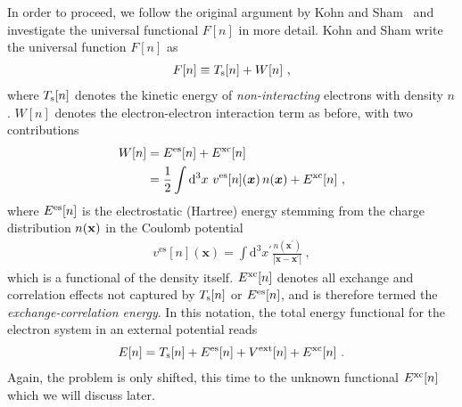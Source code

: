 In order to proceed, we follow the original argument by Kohn and Sham~\cite{Kohn.1965} and investigate the universal functional $F[n]$ in more detail. 
Kohn and Sham write the universal function $F [n]$ as
%
\begin{align}
	F[n] 
		\equiv T_{\rm s}[n] + W[n]~,
	\label{eq:dft.Fn.2}
\end{align}
%
%
where $T_{\rm s}[n]$ denotes the kinetic energy of \emph{non-interacting} electrons with density $n$. $W[n]$ denotes the electron-electron interaction term as before, with two contributions
\begin{align}
	\begin{split}
	W[n] 
		&= E^{\rm es} [n] + E^{\rm xc} [n] \\
		&= \frac{1}{2} \int \mathrm{d}^{3} x ~ 
			v^{\mathrm{es}}[n](\boldsymbol{x}) \, n(\boldsymbol{x})+E^{\mathrm{xc}}[n]~,
	\end{split}
	\label{eq:dft.KS.W}
\end{align}
where $E^{\rm es} [n]$ is the electrostatic (Hartree) energy stemming from the charge distribution $n ({\bf x})$ in the Coulomb potential
\begin{align}
	v^{\mathrm{es}}[n](\boldsymbol{x})
		= \int \mathrm{d}^{3} x^{\prime} \frac{n\left(\boldsymbol{x}^{\prime}\right)}{\left|\boldsymbol{x}-\boldsymbol{x}^{\prime}\right|}~,
	\label{eq:dft.KS.ves}
\end{align}
which is a functional of the density itself. $E^{\rm xc} [n]$ denotes all exchange and correlation effects not captured by $T_{\rm s} [n]$ or $E^{\rm es} [n]$, and is therefore termed the \emph{exchange-correlation energy}. 
%
In this notation, the total energy functional for the electron system in an external potential reads
\begin{align}
	E[n]
		= T_{\rm s}[n] +  E^{\rm es}[n] + V^{\rm ext}[n] + E^{\rm xc} [n]~.
	\label{eq:dft.Ks.En}
\end{align}
%
Again, the problem is only shifted, this time to the unknown functional $E^{\rm xc} [n]$ which we will discuss later.

